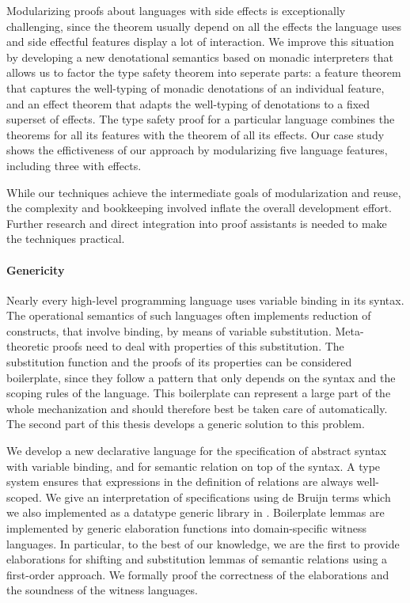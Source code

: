 Modularizing proofs about languages with side effects is exceptionally
challenging, since the theorem usually depend on all the effects the language
uses and side effectful features display a lot of interaction. We improve this
situation by developing a new denotational semantics based on monadic
interpreters that allows us to factor the type safety theorem into seperate
parts: a feature theorem that captures the well-typing of monadic denotations of
an individual feature, and an effect theorem that adapts the well-typing of
denotations to a fixed superset of effects. The type safety proof for a
particular language combines the theorems for all its features with the theorem
of all its effects. Our case study shows the effictiveness of our approach by
modularizing five language features, including three with effects.

While our techniques achieve the intermediate goals of modularization and reuse,
the complexity and bookkeeping involved inflate the overall development effort.
Further research and direct integration into proof assistants is needed to make
the techniques practical.


\paragraph{Genericity}
Nearly every high-level programming language uses variable binding in its
syntax. The operational semantics of such languages often implements reduction
of constructs, that involve binding, by means of variable substitution.
Meta-theoretic proofs need to deal with properties of this substitution. The
substitution function and the proofs of its properties can be considered
boilerplate, since they follow a pattern that only depends on the syntax and the
scoping rules of the language. This boilerplate can represent a large part of
the whole mechanization and should therefore best be taken care of
automatically. The second part of this thesis develops a generic solution to
this problem.


We develop a new declarative language \Knot for the specification of abstract
syntax with variable binding, and for semantic relation on top of the syntax. A
type system ensures that expressions in the definition of relations are always
well-scoped. We give an interpretation of \Knot specifications using de Bruijn
terms which we also implemented as a datatype generic library \Loom in \Coq.
Boilerplate lemmas are implemented by generic elaboration functions into
domain-specific witness languages. In particular, to the best of our knowledge,
we are the first to provide elaborations for shifting and substitution lemmas of
semantic relations using a first-order approach. We formally proof the
correctness of the elaborations and the soundness of the witness languages.

